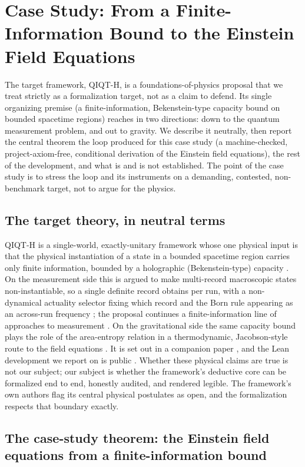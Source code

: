 \documentclass[11pt]{article}
\begin{document}
\section{Case Study: From a Finite-Information Bound to the Einstein Field Equations}

The target framework, QIQT-H, is a foundations-of-physics proposal that we treat strictly as a
formalization target, not as a claim to defend. Its single organizing premise (a finite-information,
Bekenstein-type capacity bound on bounded spacetime regions) reaches in two directions: down to the
quantum measurement problem, and out to gravity. We describe it neutrally, then report the
central theorem the loop produced for this case study (a machine-checked, project-axiom-free,
conditional derivation of the Einstein field equations),
the rest of the development, and what is and is not established. The point of the case study is to
stress the loop and its instruments on a demanding, contested, non-benchmark target, not to argue
for the physics.

\subsection{The target theory, in neutral terms}

QIQT-H is a single-world, exactly-unitary framework whose one physical input is that the physical
instantiation of a state in a bounded spacetime region carries only finite information, bounded by a
holographic (Bekenstein-type) capacity \cite{r40}. On the measurement side this is argued to make
multi-record macroscopic states non-instantiable, so a single definite record obtains per run, with
a non-dynamical actuality selector fixing which record and the Born rule appearing as an across-run
frequency \cite{r32,r33,r34}; the proposal continues a finite-information line of approaches to
measurement \cite{r41}. On the gravitational side the same capacity bound plays the role of the
area-entropy relation in a thermodynamic, Jacobson-style route to the field equations \cite{r46}. It
is set out in a companion paper \cite{r42}, and the Lean development we report on is public
\cite{r43}. Whether these physical claims are true is not our subject; our subject is whether the
framework's deductive core can be formalized end to end, honestly audited, and rendered legible. The
framework's own authors flag its central physical postulates as open, and the formalization respects
that boundary exactly.

\subsection{The case-study theorem: the Einstein field equations from a finite-information bound}
\end{document}
